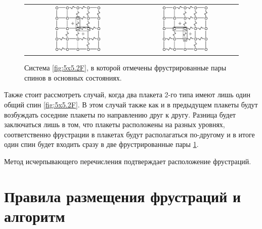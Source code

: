 \documentclass[utf8, babel, sor, jor, amsmath, amssymb, reprint]{elsarticle} %
\begin{document}
\begin{figure}[htbp]
	\centering
	\begin{tabular}{cc}
		\includegraphics[width=0.45\textwidth]{1_Cl5x5_Type2_gs1.eps} & \hspace{0.05\textwidth}
		\includegraphics[width=0.45\textwidth]{1_Cl5x5_Type2_gs2.eps} 
	\end{tabular}
	\caption{Система \ref{fig:5x5.2F}, в которой отмечены фрустрированные пары спинов в основных состояниях.}
	\label{fig:5x5.22F}
\end{figure}

Также стоит рассмотреть случай, когда два плакета 2-го типа имеют лишь один общий спин \ref{fig:5x5.2F}.
В этом случай также как и в предыдущем плакеты будут возбуждать соседние плакеты по направлению друг к другу. Разница будет заключаться лишь в том, что плакеты расположены на разных уровнях, соответственно фрустрации в плакетах будут располагаться по-другому и в итоге один спин будет входить сразу в две фрустрированные пары \ref{fig:5x5.22F}.

Метод исчерпывающего перечисления подтверждает расположение фрустраций.

\section{Правила размещения фрустраций и алгоритм}
\end{document}
